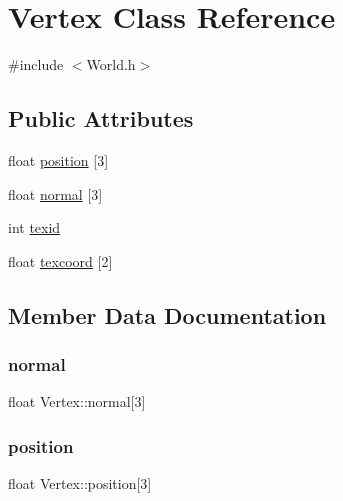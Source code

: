 \hypertarget{classVertex}{}\section{Vertex Class Reference}
\label{classVertex}


{\ttfamily \#include $<$World.\+h$>$}

\subsection*{Public Attributes}
\begin{DoxyCompactItemize}
\item 
float \mbox{\hyperlink{classVertex_a1a5f22694da8ef6c906956eea8ddc924}{position}} \mbox{[}3\mbox{]}
\item 
float \mbox{\hyperlink{classVertex_a44dd0d22dccb4684ba4c8cb7400536fc}{normal}} \mbox{[}3\mbox{]}
\item 
int \mbox{\hyperlink{classVertex_a815ba08ef2158ab5a15b4c8a5f07b4cd}{texid}}
\item 
float \mbox{\hyperlink{classVertex_acfd7bc0aa5fbf2ff334416aeab61ac88}{texcoord}} \mbox{[}2\mbox{]}
\end{DoxyCompactItemize}


\subsection{Member Data Documentation}
\mbox{\label{classVertex_a44dd0d22dccb4684ba4c8cb7400536fc}} 
\subsubsection{\texorpdfstring{normal}{normal}}
{\footnotesize\ttfamily float Vertex\+::normal\mbox{[}3\mbox{]}}

\mbox{\label{classVertex_a1a5f22694da8ef6c906956eea8ddc924}} 
\subsubsection{\texorpdfstring{position}{position}}
{\footnotesize\ttfamily float Vertex\+::position\mbox{[}3\mbox{]}}

\mbox{\label{classVertex_acfd7bc0aa5fbf2ff334416aeab61ac88}} 
